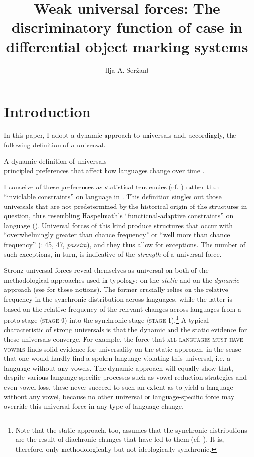 \documentclass[output=paper]{langsci/langscibook}
\author{Ilja A. Seržant\affiliation{Leipzig University}}
\title{Weak universal forces: The discriminatory function of case in differential object marking systems}
\begin{document}
\maketitle 
 

\section{Introduction}

In this paper, I adopt a dynamic approach to universals \citep{Greenberg1978_Diachr} and, accordingly, the following definition of a universal:

\ea\label{ex:serzant:1}
A dynamic definition of universals\\
principled preferences that affect how languages change over time \citep[401]{Bickel2011_Modelling}.
\z

I conceive of these preferences as statistical tendencies (cf. \citealt{Bickel2011_Modelling}) rather than “inviolable constraints” on language in \citet{Kiparsky2008}. This definition singles out those universals that are not predetermined by the historical origin of the structures in question, thus resembling Haspelmath’s “functional-adaptive constraints” on language (). Universal forces of this kind produce structures that occur with “overwhelmingly greater than chance frequency” or “well more than chance frequency” (\citealt{Greenberg1963}: 45, 47, \textit{passim}), and they thus allow for exceptions. The number of such exceptions, in turn, is indicative of the \textit{strength} of a universal force. 

Strong universal forces reveal themselves as universal on both of the methodological approaches used in typology: on the \textit{static} and on the \textit{dynamic} approach (see \citealt{Greenberg1969} for these notions). The former crucially relies on the relative frequency in the synchronic distribution across languages, while the latter is based on the relative frequency of the relevant changes across languages from a proto-stage (\textsc{stage} 0) into the synchronic stage (\textsc{stage} 1).\footnote{Note that the static approach, too, assumes that the synchronic distributions are the result of diachronic changes that have led to them (cf. ). It is, therefore, only methodologically but not ideologically synchronic.} A typical characteristic of strong universals is that the dynamic and the static evidence for these universals converge. For example, the force that \textsc{all languages must have vowels} \citep[19]{Comrie1989} finds solid evidence for universality on the static approach, in the sense that one would hardly find a spoken language violating this universal, i.e. a language without any vowels. The dynamic approach will equally show that, despite various language-specific processes such as vowel reduction strategies and even vowel loss, these never succeed to such an extent as to yield a language without any vowel, because no other universal or language-specific force may override this universal force in any type of language change.  
\end{document}

